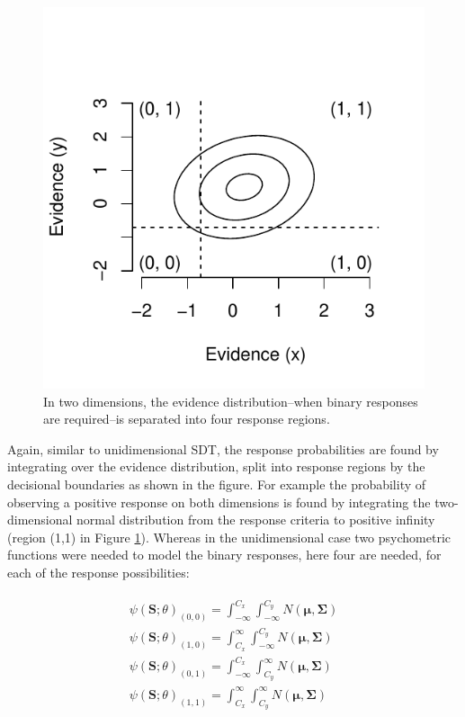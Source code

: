 \documentclass{article}\usepackage{knitr}
\begin{document}
\begin{figure}
\begin{center}
\begin{knitrout}
\color{fgcolor}
\includegraphics[width=\maxwidth]{figure/unnamed-chunk-9-1} 

\end{knitrout}
\end{center}
\caption{In two dimensions, the evidence distribution--when binary responses are required--is separated into four response regions.}
\label{fig:GRTsimple}
\end{figure}

Again, similar to unidimensional SDT, the response probabilities are found by integrating over the evidence distribution, split into response regions by the decisional boundaries as shown in the figure. For example the probability of observing a positive response on both dimensions is found by  integrating the two-dimensional normal distribution from the response criteria to positive infinity (region (1,1) in Figure \ref{fig:GRTsimple}). Whereas in the unidimensional case two psychometric functions were needed to model the binary responses, here four are needed, for each of the response possibilities:

\begin{align}
\begin{split}
\label{eq:probs}
\psi(\bm{S}; \theta)_{(0, 0)}  = \int_{-\infty}^{C_x} \int_{-\infty}^{C_y} N(\bm{\mu}, \bm{\Sigma})
\\
\psi(\bm{S}; \theta)_{(1, 0)}  = \int_{C_x}^{\infty} \int_{-\infty}^{C_y} N(\bm{\mu}, \bm{\Sigma})
\\
\psi(\bm{S}; \theta)_{(0, 1)}  = \int_{-\infty}^{C_x} \int_{C_y}^{\infty} N(\bm{\mu}, \bm{\Sigma})
\\
\psi(\bm{S}; \theta)_{(1, 1)}  = \int_{C_x}^{\infty} \int_{C_y}^{\infty} N(\bm{\mu}, \bm{\Sigma})
\end{split}
\end{align}
\end{document}
